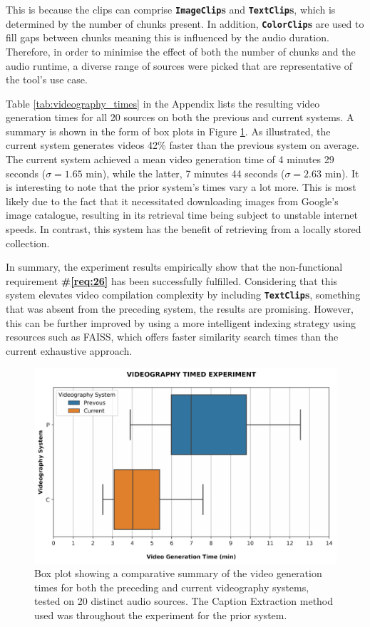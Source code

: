 \documentclass{l4proj}
\begin{document}
This is because the clips can comprise \textbf{\lstinline|ImageClip|s} and \textbf{\lstinline|TextClip|s}, which is determined by the number of chunks present. In addition, \textbf{\lstinline|ColorClip|s} are used to fill gaps between chunks meaning this is influenced by the audio duration. Therefore, in order to minimise the effect of both the number of chunks and the audio runtime, a diverse range of sources were picked that are representative of the tool's use case. 

Table \ref{tab:videography_times} in the Appendix lists the resulting video generation times for all 20 sources on both the previous and current systems. A summary is shown in the form of box plots in Figure \ref{fig:videography_timed}. As illustrated, the current system generates videos
42\% faster than the previous system on average. The current system achieved a mean video generation time of 4 minutes 29 seconds ($\sigma = 1.65$ min), while the latter, 7 minutes 44 seconds ($\sigma = 2.63$ min). It is interesting to note that the prior system's times vary a lot more. This is most likely due to the fact that it necessitated downloading images from Google's image catalogue, resulting in its retrieval time being subject to unstable internet speeds. In contrast, this system has the benefit of retrieving from a locally stored collection.

In summary, the experiment results empirically show that the non-functional requirement \textbf{\#\ref{req:26}} has been successfully fulfilled. Considering that this system elevates video compilation complexity by including \textbf{\lstinline|TextClip|s}, something that was absent from the preceding system, the results are promising. However, this can be further improved by using a more intelligent indexing strategy using resources such as FAISS, which offers faster similarity search times than the current exhaustive approach.

\begin{figure}
    \centering
    \includegraphics[width=1\textwidth]{figures/videography_timed_experiment.pdf}
    \caption{Box plot showing a comparative summary of the video generation times for both the preceding and current videography systems, tested on 20 distinct audio sources. The Caption Extraction method used was throughout the experiment for the prior system.}
    \label{fig:videography_timed}
\end{figure}
\end{document}
